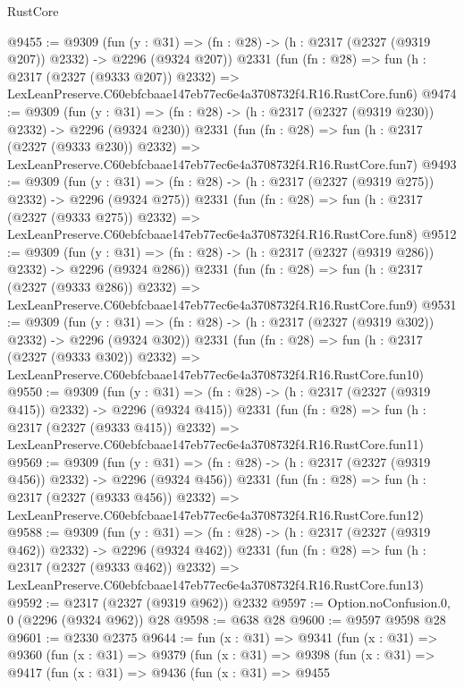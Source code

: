 \begin{lexlean}{RustCore}
\begin{coremodule}
@9455 := @9309
    (fun (y : @31) => (fn : @28) -> (h : @2317 (@2327 (@9319 @207)) @2332) -> @2296 (@9324 @207))
    @2331
    (fun (fn : @28) =>
    fun (h : @2317 (@2327 (@9333 @207)) @2332) =>
    LexLeanPreserve.C60ebfcbaae147eb77ec6e4a3708732f4.R16.RustCore.fun6)
@9474 := @9309
    (fun (y : @31) => (fn : @28) -> (h : @2317 (@2327 (@9319 @230)) @2332) -> @2296 (@9324 @230))
    @2331
    (fun (fn : @28) =>
    fun (h : @2317 (@2327 (@9333 @230)) @2332) =>
    LexLeanPreserve.C60ebfcbaae147eb77ec6e4a3708732f4.R16.RustCore.fun7)
@9493 := @9309
    (fun (y : @31) => (fn : @28) -> (h : @2317 (@2327 (@9319 @275)) @2332) -> @2296 (@9324 @275))
    @2331
    (fun (fn : @28) =>
    fun (h : @2317 (@2327 (@9333 @275)) @2332) =>
    LexLeanPreserve.C60ebfcbaae147eb77ec6e4a3708732f4.R16.RustCore.fun8)
@9512 := @9309
    (fun (y : @31) => (fn : @28) -> (h : @2317 (@2327 (@9319 @286)) @2332) -> @2296 (@9324 @286))
    @2331
    (fun (fn : @28) =>
    fun (h : @2317 (@2327 (@9333 @286)) @2332) =>
    LexLeanPreserve.C60ebfcbaae147eb77ec6e4a3708732f4.R16.RustCore.fun9)
@9531 := @9309
    (fun (y : @31) => (fn : @28) -> (h : @2317 (@2327 (@9319 @302)) @2332) -> @2296 (@9324 @302))
    @2331
    (fun (fn : @28) =>
    fun (h : @2317 (@2327 (@9333 @302)) @2332) =>
    LexLeanPreserve.C60ebfcbaae147eb77ec6e4a3708732f4.R16.RustCore.fun10)
@9550 := @9309
    (fun (y : @31) => (fn : @28) -> (h : @2317 (@2327 (@9319 @415)) @2332) -> @2296 (@9324 @415))
    @2331
    (fun (fn : @28) =>
    fun (h : @2317 (@2327 (@9333 @415)) @2332) =>
    LexLeanPreserve.C60ebfcbaae147eb77ec6e4a3708732f4.R16.RustCore.fun11)
@9569 := @9309
    (fun (y : @31) => (fn : @28) -> (h : @2317 (@2327 (@9319 @456)) @2332) -> @2296 (@9324 @456))
    @2331
    (fun (fn : @28) =>
    fun (h : @2317 (@2327 (@9333 @456)) @2332) =>
    LexLeanPreserve.C60ebfcbaae147eb77ec6e4a3708732f4.R16.RustCore.fun12)
@9588 := @9309
    (fun (y : @31) => (fn : @28) -> (h : @2317 (@2327 (@9319 @462)) @2332) -> @2296 (@9324 @462))
    @2331
    (fun (fn : @28) =>
    fun (h : @2317 (@2327 (@9333 @462)) @2332) =>
    LexLeanPreserve.C60ebfcbaae147eb77ec6e4a3708732f4.R16.RustCore.fun13)
@9592 := @2317 (@2327 (@9319 @962)) @2332
@9597 := Option.noConfusion.{0, 0} (@2296 (@9324 @962)) @28
@9598 := @638 @28
@9600 := @9597 @9598 @28
@9601 := @2330 @2375
@9644 := fun (x : @31) =>
  @9341
    (fun (x : @31) =>
    @9360
      (fun (x : @31) =>
      @9379
        (fun (x : @31) =>
        @9398
          (fun (x : @31) =>
          @9417
            (fun (x : @31) =>
            @9436
              (fun (x : @31) =>
              @9455

\end{coremodule}
\end{lexlean}
